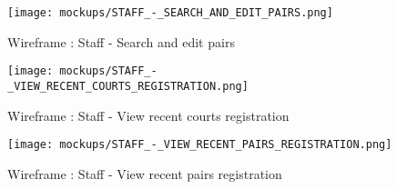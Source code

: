 \begin{figure}[!ht]
    \centering
    \texttt{[image: mockups/STAFF\_-\_SEARCH\_AND\_EDIT\_PAIRS.png]}
    \caption{Wireframe : Staff - Search and edit pairs}
\end{figure}
\FloatBarrier

\begin{figure}[!ht]
    \centering
    \texttt{[image: mockups/STAFF\_-\_VIEW\_RECENT\_COURTS\_REGISTRATION.png]}
    \caption{Wireframe : Staff - View recent courts registration}
\end{figure}
\FloatBarrier

\begin{figure}[!ht]
    \centering
    \texttt{[image: mockups/STAFF\_-\_VIEW\_RECENT\_PAIRS\_REGISTRATION.png]}
    \caption{Wireframe : Staff - View recent pairs registration}
\end{figure}
\FloatBarrier

